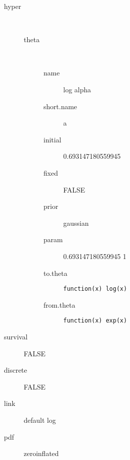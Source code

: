\begin{description}
	\item[hyper]\ 
	 \begin{description}
	 	\item[theta]\ 
	 	 \begin{description}
	 	 	\item[name] log alpha
	 	 	\item[short.name] a
	 	 	\item[initial] 0.693147180559945
	 	 	\item[fixed] FALSE
	 	 	\item[prior] gaussian
	 	 	\item[param] 0.693147180559945 1
	 	 	\item[to.theta] \verb|function(x) log(x)|
	 	 	\item[from.theta] \verb|function(x) exp(x)|
	 	 \end{description}
	 \end{description}
	\item[survival] FALSE
	\item[discrete] FALSE
	\item[link] default log
	\item[pdf] zeroinflated
\end{description}
